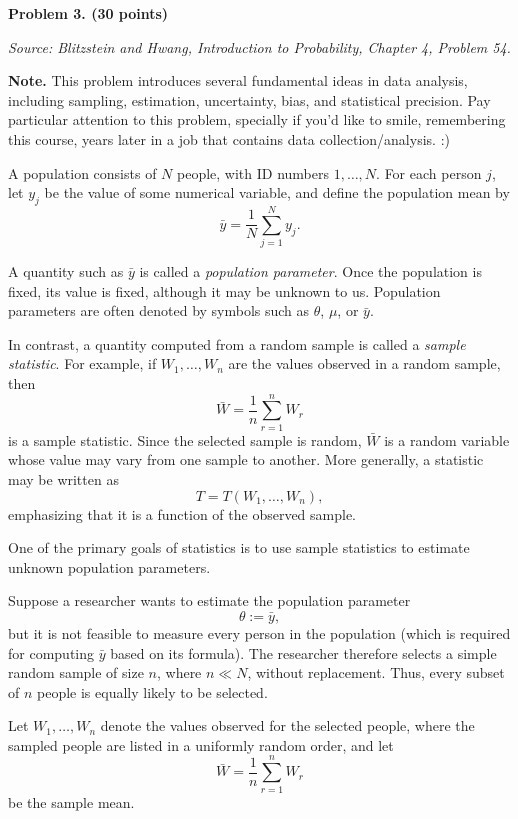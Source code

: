 \documentclass[11pt]{article}
\newcommand{\source}[1]{%
    \vspace{0.15cm}
    {\small\textit{Source: Blitzstein and Hwang, \textit{Introduction to Probability}, Chapter 4, Problem #1.}}
}
\begin{document}


\begin{problemheader}
\textbf{Problem 3.  (30 points)}
\end{problemheader}
\source{54}

\textbf{Note.}
This problem introduces several fundamental ideas in data analysis, including
sampling, estimation, uncertainty, bias, and statistical precision. Pay
particular attention to this problem, specially if you'd like to smile, remembering this course, years later in a job that contains data collection/analysis. :)

A population consists of \(N\) people, with ID numbers \(1,\dots,N\). For each
person \(j\), let \(y_j\) be the value of some numerical variable, and define the
population mean by
\[
\bar y=\frac{1}{N}\sum_{j=1}^N y_j.
\]

A quantity such as \(\bar y\) is called a \emph{population parameter}. Once the
population is fixed, its value is fixed, although it may be unknown to us.
Population parameters are often denoted by symbols such as
\(\theta\), \(\mu\), or \(\bar y\).

In contrast, a quantity computed from a random sample is called a
\emph{sample statistic}. For example, if \(W_1,\dots,W_n\) are the values
observed in a random sample, then
\[
\bar W
=
\frac{1}{n}\sum_{r=1}^n W_r
\]
is a sample statistic. Since the selected sample is random, \(\bar W\) is a
random variable whose value may vary from one sample to another. More generally,
a statistic may be written as
\[
T=T(W_1,\dots,W_n),
\]
emphasizing that it is a function of the observed sample.

One of the primary goals of statistics is to use sample statistics to estimate
unknown population parameters.

Suppose a researcher wants to estimate the population parameter
\[
\theta:=\bar y,
\]
but it is not feasible to measure every person in the population (which is required for computing $\bar y$ based on its formula). The researcher
therefore selects a simple random sample of size \(n\), where \(n\ll N\),
without replacement. Thus, every subset of \(n\) people is equally likely to be
selected.

Let \(W_1,\dots,W_n\) denote the values observed for the selected people, where
the sampled people are listed in a uniformly random order, and let
\[
\bar W=\frac{1}{n}\sum_{r=1}^n W_r
\]
be the sample mean.
\end{document}
